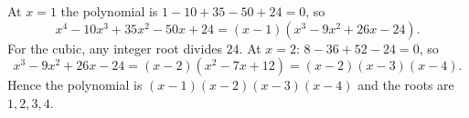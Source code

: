 At $x=1$ the polynomial is $1-10+35-50+24=0$, so
\[x^4-10x^3+35x^2-50x+24=(x-1)(x^3-9x^2+26x-24).\]
For the cubic, any integer root divides $24$. At $x=2$: $8-36+52-24=0$, so
\[x^3-9x^2+26x-24=(x-2)(x^2-7x+12)=(x-2)(x-3)(x-4).\]
Hence the polynomial is $(x-1)(x-2)(x-3)(x-4)$ and the roots are $\boxed{1,2,3,4}$.
